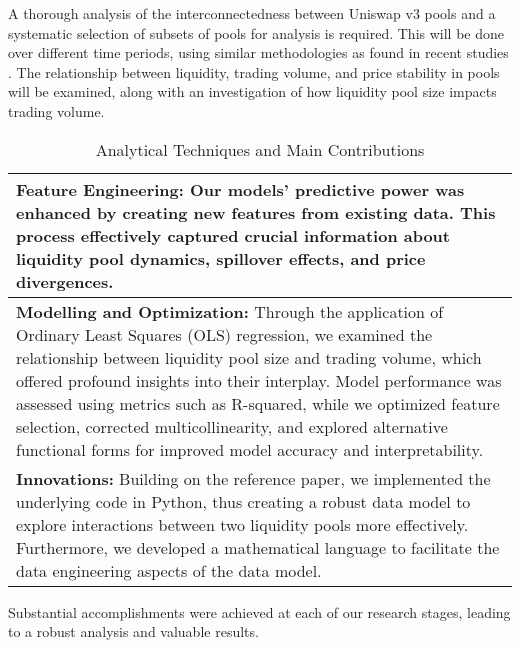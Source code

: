 \documentclass{article}
\begin{document}
A thorough analysis of the interconnectedness between Uniswap v3 pools and a systematic selection of subsets of pools for analysis is required. This will be done over different time periods, using similar methodologies as found in recent studies \cite{Miori2022}. The relationship between liquidity, trading volume, and price stability in pools will be examined, along with an investigation of how liquidity pool size impacts trading volume.

\begin{table}[htbp]
  \centering
  \small
  \begin{tabularx}{\linewidth}{|>{\raggedright\arraybackslash}X|}
  \hline
  \textbf{Feature Engineering:} Our models' predictive power was enhanced by creating new features from existing data\cite{Miori2023}. This process effectively captured crucial information about liquidity pool dynamics, spillover effects, and price divergences. \\
  \hline
  \textbf{Modelling and Optimization:} Through the application of Ordinary Least Squares (OLS) regression, we examined the relationship between liquidity pool size and trading volume, which offered profound insights into their interplay\cite{Miori2023}. Model performance was assessed using metrics such as R-squared, while we optimized feature selection, corrected multicollinearity, and explored alternative functional forms for improved model accuracy and interpretability\cite{Miori2023}. \\
  \hline
  \textbf{Innovations:} Building on the reference paper, we implemented the underlying code in Python, thus creating a robust data model to explore interactions between two liquidity pools more effectively\cite{Miori2023}. Furthermore, we developed a mathematical language to facilitate the data engineering aspects of the data model\cite{Miori2023}. \\
  \hline
  \end{tabularx}
  \caption{Analytical Techniques and Main Contributions}
  \label{fig:analytical-techniques}
  \end{table}
  
  Substantial accomplishments were achieved at each of our research stages, leading to a robust analysis and valuable results\cite{Miori2023}.
\end{document}
